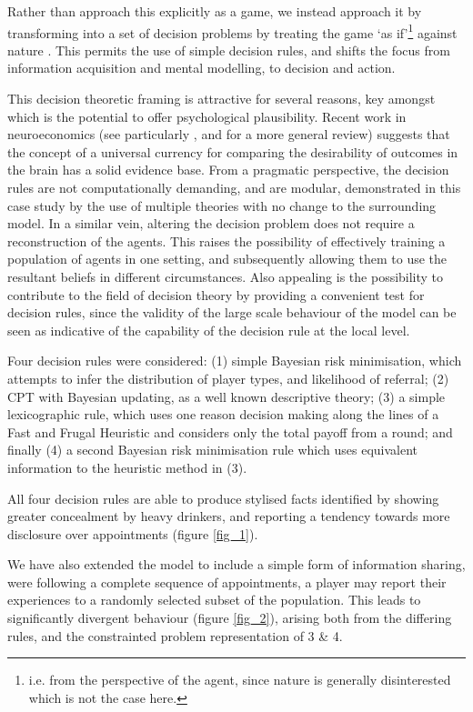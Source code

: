 \documentclass[twocolumn]{article}
\begin{document}
Rather than approach this explicitly as a game, we instead approach it by transforming into a set of decision problems by treating the game `as if'\footnote{i.e. from the perspective of the agent, since nature is generally disinterested which is not the case here.} against nature \citep{RiosInsua2009}. This permits the use of simple decision rules, and shifts the focus from information acquisition and mental modelling, to decision and action. 

This decision theoretic framing is attractive for several reasons, key amongst which is the potential to offer psychological plausibility. Recent work in neuroeconomics (see particularly \citep{Padoa-Schioppa2006}, and \citep{Rustichini2009} for a more general review) suggests that the concept of a universal currency for comparing the desirability of outcomes in the brain has a solid evidence base.  
From a pragmatic perspective, the decision rules are not computationally demanding, and are modular, demonstrated in this case study by the use of multiple theories with no change to the surrounding model.  In a similar vein, altering the decision problem does not require a reconstruction of the agents. This raises the possibility of effectively training a population of agents in one setting, and subsequently allowing them to use the resultant beliefs in different circumstances. Also appealing is the possibility to contribute to the field of decision theory by providing a convenient test for decision rules, since the validity of the large scale behaviour of the model can be seen as indicative of the capability of the decision rule at the local level.

Four decision rules were considered: (1) simple Bayesian risk minimisation, which attempts to infer the distribution of player types, and likelihood of referral; (2) \ac{CPT} \citep{Tversky1992} with Bayesian updating, as a well known descriptive theory; (3) a simple lexicographic rule, which uses one reason decision making along the lines of a Fast and Frugal Heuristic \citep{Gigerenzer1996} and considers only the total payoff from a round; and finally (4) a second Bayesian risk minimisation rule which uses equivalent information to the heuristic method in (3).

All four decision rules are able to produce stylised facts identified by \citep{Alvik2006} showing greater concealment by heavy drinkers, and \citep{Phillips2007} reporting a tendency towards more disclosure over appointments (figure \ref{fig_1}). 

We have also extended the model to include a simple form of information sharing, were following a complete sequence of appointments, a player may report their experiences to a randomly selected subset of the population. This leads to significantly divergent behaviour (figure \ref{fig_2}), arising both from the differing rules, and the constrainted problem representation of 3 \& 4. 
\end{document}
